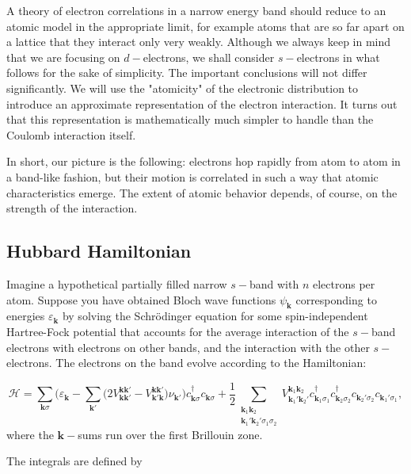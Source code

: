 A theory of electron correlations in a narrow energy band should reduce to an atomic model in the appropriate limit, for example atoms that are so far apart on a lattice that they interact only very weakly.
Although we always keep in mind that we are focusing on $d-$electrons, we shall consider $s-$electrons in what follows for the sake of simplicity.
The important conclusions will not differ significantly.
We will use the "atomicity" of the electronic distribution to introduce an approximate representation of the electron interaction.
It turns out that this representation is mathematically much simpler to handle than the Coulomb interaction itself.

In short, our picture is the following: electrons hop rapidly from atom to atom in a band-like fashion, but their motion is correlated in such a way that atomic characteristics emerge.
The extent of atomic behavior depends, of course, on the strength of the interaction.

\subsection{Hubbard Hamiltonian}\label{subsec:hubbardHamiltonian}

Imagine a hypothetical partially filled narrow $s-$band with $n$ electrons per atom.
Suppose you have obtained Bloch wave functions $\psi_{\bm k}$ corresponding to energies $\varepsilon_{\bm k}$ by solving the Schr\"odinger equation for some spin-independent Hartree-Fock potential that accounts for the average interaction of the $s-$band electrons with electrons on other bands, and the interaction with the other $s-$electrons.
The electrons on the band evolve according to the Hamiltonian:

\begin{equation}\label{eq:startingHamiltonian}
\mathcal{H} = \sum_{\bm k \sigma} \bigg( \varepsilon_{\bm k} - \sum_{ \bm k'} \big( 2 V^{\bm k \bm k'}_{\bm k \bm k'} - V^{\bm k \bm k'}_{\bm k' \bm k} \big) \nu_{\bm k'} \bigg) c_{\bm k \sigma}^\dagger c_{\bm k \sigma} +  \frac{1}{2} \sum_{ \substack{\bm k_1 \bm k_2 \\ \bm k_1' \bm k_2'  \sigma_1 \sigma_2 } } V^{\bm k_1 \bm k_2}_{\bm k_1' \bm k_2'}
 c_{\bm k_1 \sigma_1}^\dagger c_{\bm k_2 \sigma_2}^\dagger c_{\bm k_2' \sigma_2} c_{\bm k_1' \sigma_1} ,
\end{equation}
where the $\bm k-$sums run over the first Brillouin zone.

The integrals are defined by

